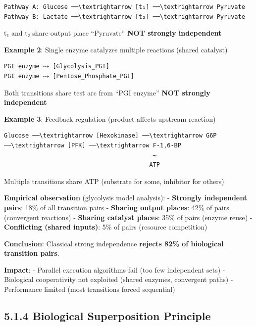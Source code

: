 \begin{lstlisting}
Pathway A: Glucose ──\textrightarrow [t₁] ──\textrightarrow Pyruvate
Pathway B: Lactate ──\textrightarrow [t₂] ──\textrightarrow Pyruvate
\end{lstlisting}

t₁ and t₂ share output place ``Pyruvate'' \textrightarrow \textbf{NOT strongly
independent}

\textbf{Example 2}: Single enzyme catalyzes multiple reactions (shared
catalyst)

\begin{lstlisting}
PGI enzyme ⤏ [Glycolysis_PGI]
PGI enzyme ⤏ [Pentose_Phosphate_PGI]
\end{lstlisting}

Both transitions share test arc from ``PGI enzyme'' \textrightarrow \textbf{NOT
strongly independent}

\textbf{Example 3}: Feedback regulation (product affects upstream
reaction)

\begin{lstlisting}
Glucose ──\textrightarrow [Hexokinase] ──\textrightarrow G6P ──\textrightarrow [PFK] ──\textrightarrow F-1,6-BP
                                          ⊸
                                         ATP
\end{lstlisting}

Multiple transitions share ATP (substrate for some, inhibitor for
others)

\textbf{Empirical observation} (glycolysis model analysis): -
\textbf{Strongly independent pairs}: 18\% of all transition pairs -
\textbf{Sharing output places}: 42\% of pairs (convergent reactions) -
\textbf{Sharing catalyst places}: 35\% of pairs (enzyme reuse) -
\textbf{Conflicting (shared inputs)}: 5\% of pairs (resource
competition)

\textbf{Conclusion}: Classical strong independence \textbf{rejects 82\%
of biological transition pairs}.

\textbf{Impact}: - \texttimes Parallel execution algorithms fail (too few
independent sets) - \texttimes Biological cooperativity not exploited (shared
enzymes, convergent paths) - \texttimes Performance limited (most transitions
forced sequential)

\hypertarget{biological-superposition-principle}{%
\subsection{5.1.4 Biological Superposition
Principle}\label{biological-superposition-principle}}

